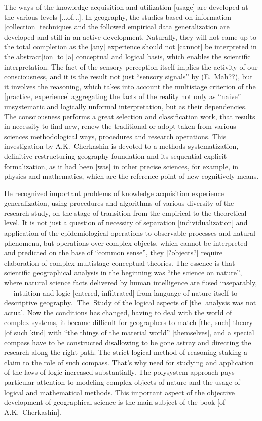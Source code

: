 \documentclass[12pt,leqno]{book}
\numberwithin{equation}{chapter}
\begin{document}
The ways of the knowledge acquisition and utilization [usage] are developed at the various levels [...of...]. In geography, the studies based on information [collection] techniques and the followed empirical data generalization are developed and still in an active development. Naturally, they will not came up to the total completion as the [any] experience should not [cannot] be interpreted in the abstract[ion] to [a] conceptual and logical basis, which enables the scientific interpretation. The fact of the sensory perception itself implies the activity of our consciousness, and it is the result not just ``sensory signals'' by (E.~Mah??), but it involves the reasoning, which takes into account the multistage criterion of the [practice, experience] aggregating the facts of the reality not only as ``naive'' unsystematic and logically unformal interpretation, but as their dependencies. The consciousness performs a great selection and classification work, that results in necessity to find new, renew the traditional or adopt taken from various sciences methodological ways, procedures and research operations. This investigation by A.K.~Cherkashin is devoted to a methods systematization, definitive restructuring geography foundation and its sequential explicit formalization, as it had been [was] in other precise sciences, for example, in physics and mathematics, which are the reference point of new cognitively means.

He recognized important problems of knowledge acquisition experience generalization, using procedures and algorithms of various diversity of the research study, on the stage of transition from the empirical to the theoretical level. It is not just a question of necessity of separation [individualization] and application of the epidemiological operations to observable processes and natural phenomena, but operations over complex objects, which cannot be interpreted and predicted on the base of ``common sense'', they [?objects?] require elaboration of complex multistage conceptual theories. The essence is that scientific geographical analysis in the beginning was ``the science on nature'', where natural science facts delivered by human intelligence are fused inseparably, --- intuition and logic [entered, infiltrated] from language of nature itself to descriptive geography. [The] Study of the logical aspects of [the] analysis was not actual. Now the conditions has changed, having to deal with the world of complex systems, it became difficult for geographers to match [the, such] theory [of such kind] with ``the things of the material world'' [themselves], and a special compass have to be constructed disallowing to be gone astray and directing the research along the right path. The strict logical method of reasoning staking a claim to the role of such compass. That's why need for studying and application of the laws of logic increased substantially. The polysystem approach pays particular attention to modeling complex objects of nature and the usage of logical and mathematical methods. This important aspect of the objective development of geographical science is the main subject of the book [of A.K.~Cherkashin].
\end{document}
